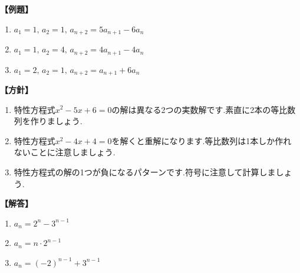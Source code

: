     \noindent \textbf{【例題】}
    \begin{enumerate}[label=(\arabic*),parsep=3pt]
      \item $\displaystyle a_1=1,\,a_2=1,\, a_{n+2}=5a_{n+1}-6a_n$
      \item $\displaystyle a_1=1,\,a_2=4,\, a_{n+2}=4a_{n+1}-4a_n$
      \item $\displaystyle a_1=2,\,a_2=1,\, a_{n+2}=a_{n+1}+6a_n$
    \end{enumerate}

    \noindent\textbf{【方針】}
    \begin{enumerate}[label=(\arabic*),parsep=3pt]
      \item 特性方程式$x^2-5x+6=0$の解は異なる2つの実数解です.素直に2本の等比数列を作りましょう.
      \item 特性方程式$x^2-4x+4=0$を解くと重解になります.等比数列は1本しか作れないことに注意しましょう.
      \item 特性方程式の解の1つが負になるパターンです.符号に注意して計算しましょう.
    \end{enumerate}

    \noindent\textbf{【解答】}
    \begin{enumerate}[label=(\arabic*),parsep=3pt]
      \item $\displaystyle a_n=2^n-3^{n-1}$
      \item $\displaystyle a_n=n\cdot2^{n-1}$
      \item $\displaystyle a_n=(-2)^{n-1}+3^{n-1}$
    \end{enumerate}

